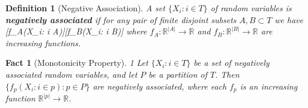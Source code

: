 \documentclass{article}
\newtheorem{fact}[theorem]{Fact}
\newtheorem{definition}[theorem]{Definition}
\newcommand*{\defn}[1]{\textbf{#1}}
\newcommand*{\R}[0]{\mathbb{R}}
\newcommand*{\E}[0]{\mathbf{E}}
\def\[#1\]{\begin{align*}#1\end{align*}}
\begin{document}

\begin{definition}[Negative Association]
  A set $\{X_i : i \in T\}$ of random variables is \defn{negatively associated} if for any pair of finite disjoint subsets $A, B \subset T$
  we have
  \[\E[f_A(X_i: i \in A)f_B(X_i: i \in B)] \le \E[f_A(X_i: i \in A)]\E[f_B(X_i: i \in B)]\]
  where $f_A : \R^{|A|} \to \R$ and $f_B : \R^{|B|} \to \R$ are increasing functions.
\end{definition}

\begin{fact}[Monotonicity Property]1
  Let $\{X_i : i \in T\}$ be a set of negatively associated random variables,
  and let $P$ be a partition of $T$.
  Then $\{f_p(X_i : i \in p) : p \in P\}$ are negatively associated,
  where each $f_p$ is an increasing function $\R^{|p|} \to \R$.
\end{fact}
\end{document}
